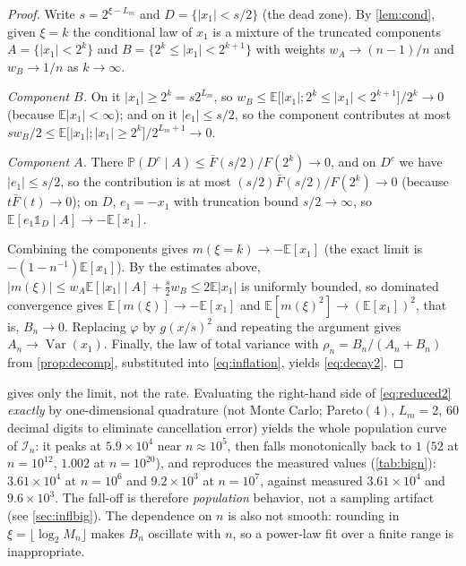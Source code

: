 \documentclass[twocolumn,review,hidelinks,oneeqnum,onetabnum,onefignum,onethmnum]{siamart251216}
\begin{document}
\begin{proof}
Write $s=2^{\xi-L_m}$ and $D=\{|x_1|<s/2\}$ (the dead zone). By \cref{lem:cond},
given $\xi=k$ the conditional law of $x_1$ is a mixture of the truncated
components $A=\{|x_1|<2^k\}$ and $B=\{2^k\le|x_1|<2^{k+1}\}$ with weights
$w_A\to(n-1)/n$ and $w_B\to1/n$ as $k\to\infty$.

\emph{Component $B$.} On it $|x_1|\ge2^k=s2^{L_m}$, so
$w_B\le\mathbb E\bigl[|x_1|;2^k\le|x_1|<2^{k+1}\bigr]/2^k\to0$ (because
$\mathbb E|x_1|<\infty$); and on it $|e_1|\le s/2$, so the component contributes
at most
$s w_B/2\le\mathbb E\bigl[|x_1|;|x_1|\ge2^k\bigr]/2^{L_m+1}\to0$.

\emph{Component $A$.} There
$\mathbb P(D^c\mid A)\le\bar F(s/2)/F(2^k)\to0$, and on $D^c$ we have
$|e_1|\le s/2$, so the contribution is at most
$(s/2)\bar F(s/2)/F(2^k)\to0$ (because $t\bar F(t)\to0$); on $D$, $e_1=-x_1$
with truncation bound $s/2\to\infty$, so
$\mathbb E[e_1\mathbb 1_D\mid A]\to-\mathbb E[x_1]$.

Combining the components gives $m(\xi=k)\to-\mathbb E[x_1]$ (the exact limit
is $-(1-n^{-1})\mathbb E[x_1]$). By the estimates above,
$|m(\xi)|\le w_A\mathbb E[|x_1|\mid A]+\tfrac s2w_B\le2\mathbb E|x_1|$ is
uniformly bounded, so dominated convergence gives
$\mathbb E[m(\xi)]\to-\mathbb E[x_1]$ and
$\mathbb E[m(\xi)^2]\to(\mathbb E[x_1])^2$, that is, $B_n\to0$. Replacing
$\varphi$ by $g(x/s)^2$ and repeating the argument gives
$A_n\to\operatorname{Var}(x_1)$. Finally, the law of total variance with
$\rho_n=B_n/(A_n+B_n)$ from \cref{prop:decomp}, substituted into
\cref{eq:inflation}, yields \cref{eq:decay2}.
\end{proof}

\begin{remark}
 gives only the limit, not the rate. Evaluating the right-hand
side of \cref{eq:reduced2} \emph{exactly} by one-dimensional quadrature (not
Monte Carlo; Pareto$(4)$, $L_m=2$, $60$ decimal digits to eliminate cancellation
error) yields the whole population curve of $\mathcal I_n$: it peaks at
$5.9\times10^4$ near $n\approx10^5$, then falls monotonically back to $1$ ($52$
at $n=10^{12}$, $1.002$ at $n=10^{20}$), and reproduces the measured values
(\cref{tab:bign}): $3.61\times10^4$ at $n=10^6$ and $9.2\times10^3$ at $n=10^7$,
against measured $3.61\times10^4$ and $9.6\times10^3$. The fall-off is therefore
\emph{population} behavior, not a sampling artifact (see \cref{sec:inflbig}).
The dependence on $n$ is also not smooth: rounding in
$\xi=\lfloor\log_2M_n\rfloor$ makes $B_n$ oscillate with $n$, so a power-law fit
over a finite range is inappropriate.
\end{remark}
\end{document}
